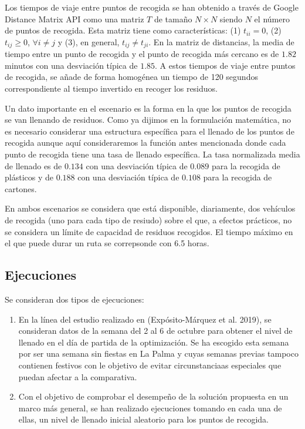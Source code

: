 \documentclass[
]{article}
\providecommand{\tightlist}{%
  \setlength{\itemsep}{0pt}\setlength{\parskip}{0pt}}
\begin{document}
Los tiempos de viaje entre puntos de recogida se han obtenido a través
de Google Distance Matrix API como una matriz \(T\) de tamaño
\(N\times N\) siendo \(N\) el número de puntos de recogida. Esta matriz
tiene como características: (1) \(t_{ii} = 0\), (2) \(t_{ij} \geq 0\),
\(\forall i\neq j\) y (3), en general, \(t_{ij}\neq t_{ji}\). En la
matriz de distancias, la media de tiempo entre un punto de recogida y el
punto de recogida más cercano es de \(1.82\) minutos con una desviación
típica de \(1.85\). A estos tiempos de viaje entre puntos de recogida,
se añade de forma homogénea un tiempo de 120 segundos correspondiente al
tiempo invertido en recoger los residuos.

Un dato importante en el escenario es la forma en la que los puntos de
recogida se van llenando de residuos. Como ya dijimos en la formulación
matemática, no es necesario considerar una estructura específica para el
llenado de los puntos de recogida aunque aquí consideraremos la función
antes mencionada donde cada punto de recogida tiene una tasa de llenado
específica. La tasa normalizada media de llenado es de \(0.134\) con una
desviación típica de \(0.089\) para la recogida de plásticos y de
\(0.188\) con una desviación típica de \(0.108\) para la recogida de
cartones.

En ambos escenarios se considera que está disponible, diariamente, dos
vehículos de recogida (uno para cada tipo de resiudo) sobre el que, a
efectos prácticos, no se considera un límite de capacidad de residuos
recogidos. El tiempo máximo en el que puede durar un ruta se correpsonde
con 6.5 horas.

\hypertarget{ejecuciones}{%
\subsection{Ejecuciones}\label{ejecuciones}}

Se consideran dos tipos de ejecuciones:

\begin{enumerate}
\def\labelenumi{\arabic{enumi}.}
\tightlist
\item
  En la línea del estudio realizado en (Expósito-Márquez et al. 2019),
  se consideran datos de la semana del 2 al 6 de octubre para obtener el
  nivel de llenado en el día de partida de la optimización. Se ha
  escogido esta semana por ser una semana sin fiestas en La Palma y
  cuyas semanas previas tampoco contienen festivos con le objetivo de
  evitar circunstanciaas especiales que puedan afectar a la comparativa.
\item
  Con el objetivo de comprobar el desempeño de la solución propuesta en
  un marco más general, se han realizado ejecuciones tomando en cada una
  de ellas, un nivel de llenado inicial aleatorio para los puntos de
  recogida.
\end{enumerate}
\end{document}
